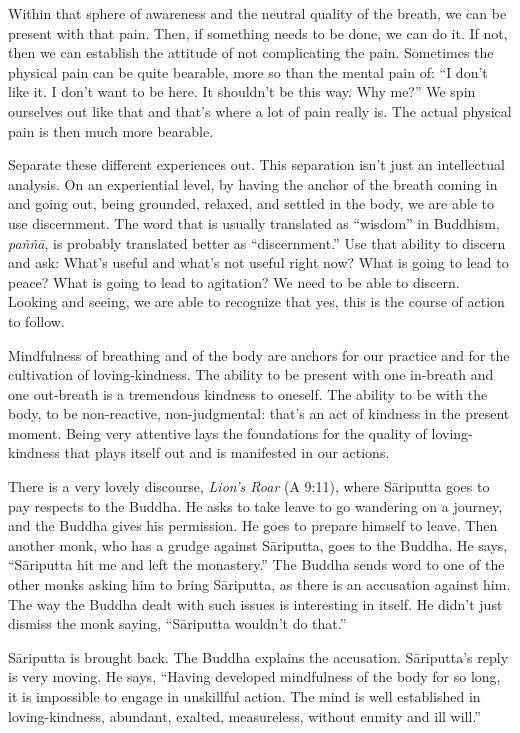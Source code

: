 Within that sphere of awareness and the neutral quality of the breath,
we can be present with that pain. Then, if something needs to be done,
we can do it. If not, then we can establish the attitude of not
complicating the pain. Sometimes the physical pain can be quite
bearable, more so than the mental pain of: “I don’t like it. I don’t
want to be here. It shouldn’t be this way. Why me?” We spin ourselves
out like that and that’s where a lot of pain really is. The actual
physical pain is then much more bearable.

Separate these different experiences out. This separation isn’t just an
intellectual analysis. On an experiential level, by having the anchor of
the breath coming in and going out, being grounded, relaxed, and settled
in the body, we are able to use discernment. The word that is usually
translated as “wisdom” in Buddhism, \emph{paññā}, is probably translated
better as “discernment.” Use that ability to discern and ask: What’s
useful and what’s not useful right now? What is going to lead to peace?
What is going to lead to agitation? We need to be able to discern.
Looking and seeing, we are able to recognize that yes, this is the
course of action to follow.

Mindfulness of breathing and of the body are anchors for our practice
and for the cultivation of loving-kindness. The ability to be present
with one in-breath and one out-breath is a tremendous kindness to
oneself. The ability to be with the body, to be non-reactive,
non-judgmental: that’s an act of kindness in the present moment. Being
very attentive lays the foundations for the quality of loving-kindness
that plays itself out and is manifested in our actions.

There is a very lovely discourse, \emph{Lion’s Roar} (A 9:11), where
Sāriputta goes to pay respects to the Buddha. He asks to take leave to
go wandering on a journey, and the Buddha gives his permission. He goes
to prepare himself to leave. Then another monk, who has a grudge against
Sāriputta, goes to the Buddha. He says, “Sāriputta hit me and left the
monastery.” The Buddha sends word to one of the other monks asking him
to bring Sāriputta, as there is an accusation against him. The way the
Buddha dealt with such issues is interesting in itself. He didn’t just
dismiss the monk saying, “Sāriputta wouldn’t do that.”

Sāriputta is brought back. The Buddha explains the accusation.
Sāriputta’s reply is very moving. He says, “Having developed mindfulness
of the body for so long, it is impossible to engage in unskillful
action. The mind is well established in loving-kindness, abundant,
exalted, measureless, without enmity and ill will.”

